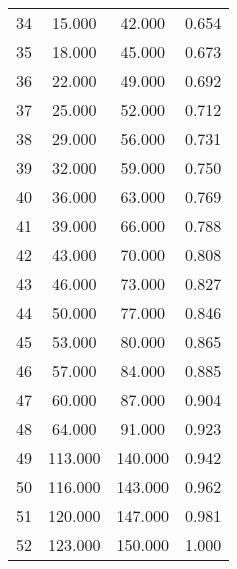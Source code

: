 \begin{tabular}{cccc}
  34 & 15.000 & 42.000 & 0.654 \\ 
  35 & 18.000 & 45.000 & 0.673 \\ 
  36 & 22.000 & 49.000 & 0.692 \\ 
  37 & 25.000 & 52.000 & 0.712 \\ 
  38 & 29.000 & 56.000 & 0.731 \\ 
  39 & 32.000 & 59.000 & 0.750 \\ 
  40 & 36.000 & 63.000 & 0.769 \\ 
  41 & 39.000 & 66.000 & 0.788 \\ 
  42 & 43.000 & 70.000 & 0.808 \\ 
  43 & 46.000 & 73.000 & 0.827 \\ 
  44 & 50.000 & 77.000 & 0.846 \\ 
  45 & 53.000 & 80.000 & 0.865 \\ 
  46 & 57.000 & 84.000 & 0.885 \\ 
  47 & 60.000 & 87.000 & 0.904 \\ 
  48 & 64.000 & 91.000 & 0.923 \\ 
  49 & 113.000 & 140.000 & 0.942 \\ 
  50 & 116.000 & 143.000 & 0.962 \\ 
  51 & 120.000 & 147.000 & 0.981 \\ 
  52 & 123.000 & 150.000 & 1.000 \\ 
   \hline
\end{tabular}
